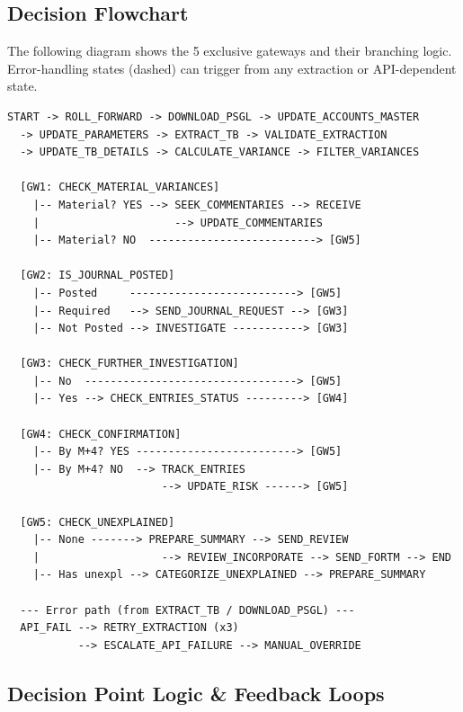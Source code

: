 \documentclass[11pt,a4paper]{article}
\begin{document}
\subsection{Decision Flowchart}

The following diagram shows the 5 exclusive gateways and their branching logic. 
Error-handling states (dashed) can trigger from any extraction or API-dependent state.

\begin{lstlisting}
START -> ROLL_FORWARD -> DOWNLOAD_PSGL -> UPDATE_ACCOUNTS_MASTER
  -> UPDATE_PARAMETERS -> EXTRACT_TB -> VALIDATE_EXTRACTION
  -> UPDATE_TB_DETAILS -> CALCULATE_VARIANCE -> FILTER_VARIANCES

  [GW1: CHECK_MATERIAL_VARIANCES]
    |-- Material? YES --> SEEK_COMMENTARIES --> RECEIVE
    |                     --> UPDATE_COMMENTARIES
    |-- Material? NO  --------------------------> [GW5]

  [GW2: IS_JOURNAL_POSTED]
    |-- Posted     --------------------------> [GW5]
    |-- Required   --> SEND_JOURNAL_REQUEST --> [GW3]
    |-- Not Posted --> INVESTIGATE -----------> [GW3]

  [GW3: CHECK_FURTHER_INVESTIGATION]
    |-- No  ---------------------------------> [GW5]
    |-- Yes --> CHECK_ENTRIES_STATUS ---------> [GW4]

  [GW4: CHECK_CONFIRMATION]
    |-- By M+4? YES -------------------------> [GW5]
    |-- By M+4? NO  --> TRACK_ENTRIES
                        --> UPDATE_RISK ------> [GW5]

  [GW5: CHECK_UNEXPLAINED]
    |-- None -------> PREPARE_SUMMARY --> SEND_REVIEW
    |                   --> REVIEW_INCORPORATE --> SEND_FORTM --> END
    |-- Has unexpl --> CATEGORIZE_UNEXPLAINED --> PREPARE_SUMMARY

  --- Error path (from EXTRACT_TB / DOWNLOAD_PSGL) ---
  API_FAIL --> RETRY_EXTRACTION (x3)
           --> ESCALATE_API_FAILURE --> MANUAL_OVERRIDE
\end{lstlisting}

\subsection{Decision Point Logic \& Feedback Loops}
\end{document}

